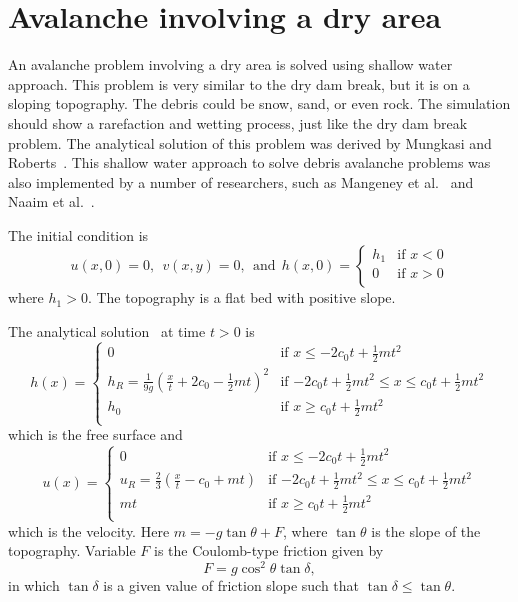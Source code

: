 
\section{Avalanche involving a dry area}

An avalanche problem involving a dry area is solved using shallow water approach. This problem is very similar to the dry dam break, but it is on a sloping topography. The debris could be snow, sand, or even rock. The simulation should show a rarefaction and wetting process, just like the dry dam break problem. The analytical solution of this problem was derived by Mungkasi and Roberts~\cite{MR2011DA}. This shallow water approach to solve debris avalanche problems was also implemented by a number of researchers, such as Mangeney et al.~\cite{MHR2000} and Naaim et al.~\cite{NVC1997}. 

The initial condition is
\begin{equation} \label{eq:dap_init}
u(x,0)=0, ~~v(x,y)=0, ~~\textrm{and}~~
h(x,0) = \left\{ \begin{array}{ll}
h_1 & \textrm{if $x < 0$}\\
0 & \textrm{if $x > 0$}\\
\end{array} \right.
\end{equation}
where $h_1>0$. The topography is a flat bed with positive slope.

The analytical solution~\cite{MR2011DA} at time $t>0$ is
\begin{equation} 
h(x) = \left\{ \begin{array}{ll}
0 & \textrm{if $x \leq -2 c_0 t + \frac12 mt^2$}\\
h_R=\frac{1}{9g} \left( \frac{x}{t} + 2c_0 - \frac12 mt \right)^2 & \textrm{if $-2 c_0 t + \frac12 mt^2 \leq x \leq c_0 t + \frac12 mt^2$}\\
h_0 & \textrm{if $x \geq c_0 t + \frac12 mt^2$}\\
\end{array} \right.
\end{equation}
which is the free surface and
\begin{equation} 
u(x) = \left\{ \begin{array}{ll}
0 & \textrm{if $x \leq -2 c_0 t + \frac12 mt^2$}\\
u_R=\frac23 \left( \frac{x}{t} - c_0 + mt \right) & \textrm{if $-2 c_0 t + \frac12 mt^2 \leq x \leq c_0 t + \frac12 mt^2$}\\
mt & \textrm{if $x \geq c_0 t + \frac12 mt^2$}\\
\end{array} \right.
\end{equation}
which is the velocity. Here $m=-g\tan{\theta}+F$, where $\tan{\theta}$ is the slope of the topography. Variable $F$ is the Coulomb-type friction given by 
\begin{equation}
F=g \cos^2{\theta} \tan{\delta},
\end{equation}
in which $\tan{\delta}$ is a given value of friction slope such that $\tan{\delta} \leq \tan{\theta}$.


